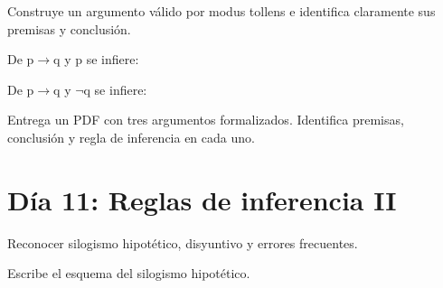\begin{activity}[id=dia-10-desarrollo-02,type=long,weight=2]

Construye un argumento válido por modus tollens e identifica claramente sus premisas y conclusión.

\end{activity}

\begin{activity}[id=dia-10-opcion-01,type=choice,weight=1]

De p\(\to\)q y p se infiere:





\end{activity}

\begin{activity}[id=dia-10-opcion-02,type=choice,weight=1]

De p\(\to\)q y \(\neg\)q se infiere:





\end{activity}

\begin{deliverable}[id=entrega-dia-10,type=upload,weight=3]

Entrega un PDF con tres argumentos formalizados. Identifica premisas, conclusión y regla de inferencia en cada uno.

\end{deliverable}

\section{Día 11: Reglas de inferencia II}

\begin{lesson}[id=dia-11-lectura,weight=0]

Reconocer silogismo hipotético, disyuntivo y errores frecuentes.

\end{lesson}

\begin{activity}[id=dia-11-corta-01,type=short,weight=1]

Escribe el esquema del silogismo hipotético.

\end{activity}

